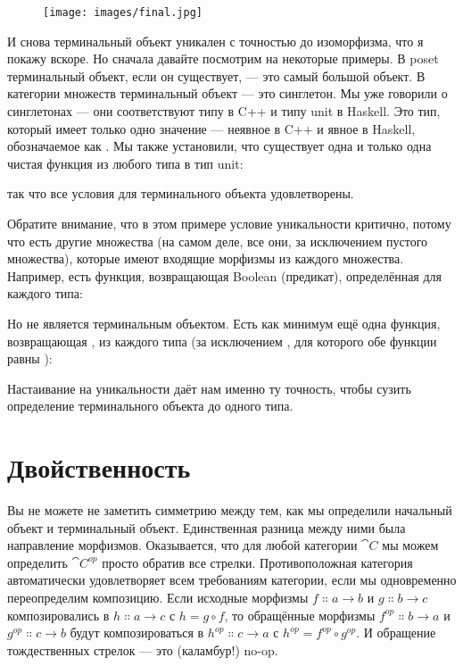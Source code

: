 \begin{figure}[H]
  \centering
  \texttt{[image: images/final.jpg]}
\end{figure}

\noindent
И снова терминальный объект уникален с точностью до изоморфизма, что я
покажу вскоре. Но сначала давайте посмотрим на некоторые примеры. В poset
терминальный объект, если он существует, --- это самый большой объект. В
категории множеств терминальный объект --- это синглетон. Мы уже
говорили о синглетонах --- они соответствуют типу  в
C++ и типу unit \code{()} в Haskell. Это тип, который имеет только
одно значение --- неявное в C++ и явное в Haskell, обозначаемое как
\code{()}. Мы также установили, что существует одна и только одна чистая
функция из любого типа в тип unit:

так что все условия для терминального объекта удовлетворены.

Обратите внимание, что в этом примере условие уникальности критично, потому что
есть другие множества (на самом деле, все они, за исключением пустого множества),
которые имеют входящие морфизмы из каждого множества. Например, есть
функция, возвращающая Boolean (предикат), определённая для каждого типа:

Но  не является терминальным объектом. Есть как минимум ещё одна
функция, возвращающая , из каждого типа (за исключением , для которого обе функции равны ):

Настаивание на уникальности даёт нам именно ту точность, чтобы сузить
определение терминального объекта до одного типа.

\section{Двойственность}

Вы не можете не заметить симметрию между тем, как мы определили
начальный объект и терминальный объект. Единственная разница между
ними была направление морфизмов. Оказывается, что для любой категории $\cat{C}$
мы можем определить  $\cat{C}^\mathit{op}$ просто
обратив все стрелки. Противоположная категория автоматически удовлетворяет
всем требованиям категории, если мы одновременно
переопределим композицию. Если исходные морфизмы
$f \Colon a \to b$ и $g \Colon b \to c$ композировались
в $h \Colon a \to c$ с $h = g \circ f$, то обращённые
морфизмы $f^\mathit{op} \Colon b \to a$ и $g^\mathit{op} \Colon c \to b$ будут композироваться в
$h^\mathit{op} \Colon c \to a$ с $h^\mathit{op} = f^\mathit{op} \circ g^\mathit{op}$. И обращение
тождественных стрелок --- это (каламбур!) no-op.

